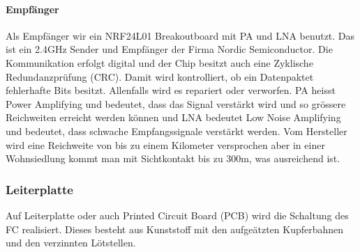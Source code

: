 \documentclass[12pt,a4paper, ngerman]{article}
\begin{document}
\paragraph{Empfänger}
Als Empfänger wir ein NRF24L01 Breakoutboard mit PA und LNA benutzt. Das ist ein 2.4GHz Sender und Empfänger der Firma Nordic Semiconductor. Die Kommunikation erfolgt digital und der Chip besitzt auch eine Zyklische Redundanzprüfung (CRC). Damit wird kontrolliert, ob ein Datenpaktet fehlerhafte Bits besitzt. Allenfalls wird es repariert oder verworfen. PA heisst Power Amplifying und bedeutet, dass das Signal verstärkt wird und so grössere Reichweiten erreicht werden können und LNA bedeutet Low Noise Amplifying und bedeutet, dass schwache Empfangssignale verstärkt werden.\cite{website:electronics.stackexchange.com_WhatisPALNA} Vom Hersteller wird eine Reichweite von bis zu einem Kilometer versprochen aber in einer Wohnsiedlung kommt man mit Sichtkontakt bis zu 300m, was ausreichend ist.

\subsubsection{Leiterplatte}
Auf Leiterplatte oder auch Printed Circuit Board (PCB) wird die Schaltung des FC realisiert. Dieses besteht aus Kunststoff mit den aufgeätzten Kupferbahnen und den verzinnten Lötstellen.
\end{document}
